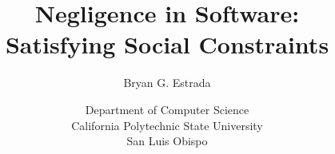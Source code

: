 \documentclass[12pt]{book}
\begin{document}

\title{Negligence in Software:\\Satisfying Social Constraints}
\author{Bryan G. Estrada}
\date{Department of Computer Science\\
      California Polytechnic State University\\
      San Luis Obispo}

\begin{titlepage}
\vfill
\maketitle\thispagestyle{empty}
\vfill
\end{titlepage}

\doublespace
\tableofcontents
\newpage










\singlespace
\appendix
%

%
\doublespace




\end{document}

